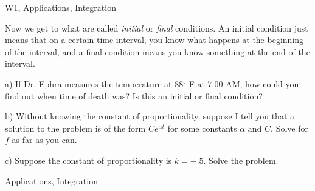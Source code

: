 \begin{tagblock}{W1, Applications, Integration}
\begin{question}
	
Now we get to what are called \emph{initial} or \emph{final} conditions. An initial condition just means that on a certain time interval, you know what happens at the beginning of the interval, and a final condition means you know something at the end of the interval. 

\bigskip

a) If Dr. Ephra measures the temperature at 88$^\circ$ F at 7:00 AM, how could you find out when time of death was? Is this an initial or final condition? 


\bigskip

b) Without knowing the constant of proportionality, suppose I tell you that a solution to the problem is of the form $Ce^{\alpha t}$ for some constants $\alpha$ and $C$. Solve for $f$ as far as you can. 

\bigskip

c) Suppose the constant of proportionality is $k=-.5$. Solve the problem.

    
\begin{tags}
        Applications, Integration
\end{tags}
    
\begin{diary}
\end{diary}
	
\begin{solution}

\end{solution}
	
\end{question}

\end{tagblock}


